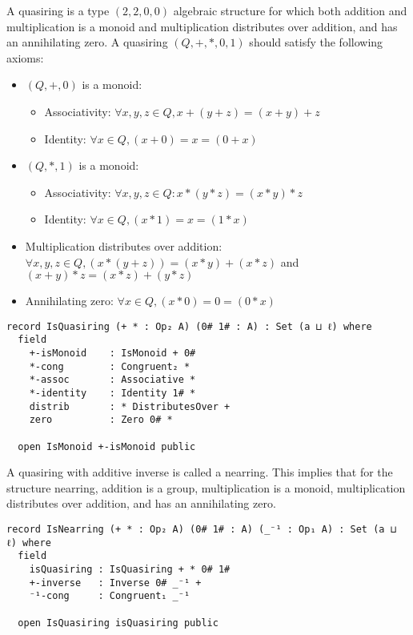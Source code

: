 A quasiring is a type $(2,2,0,0)$ algebraic structure for which both addition and
multiplication is a monoid and multiplication distributes over addition, and has
an annihilating zero. A quasiring $(Q,+,*,0,1)$ should satisfy the following axioms:
\begin{itemize}
  \item $(Q,+,0)$ is a monoid:
  \begin{itemize}
    \item Associativity: $\forall x,y,z \in Q, x + (y + z) = (x + y) + z$
    \item Identity: $\forall x \in Q, (x + 0) = x = (0 + x)$
  \end{itemize}
  \item $(Q,*,1)$ is a monoid:
  \begin{itemize}
    \item Associativity: $ \forall x,y,z \in Q: x * (y*z)  = (x*y)*z$
    \item Identity: $\forall x \in Q, (x * 1) = x = (1 * x)$
  \end{itemize}
  \item Multiplication distributes over addition: \(\forall x , y , z \in Q, (x * (y + z)) = (x * y) + (x
  * z)\) and \( (x + y) * z = (x * z) + (y * z) \)
  \item Annihilating zero: \(\forall x \in Q, (x * 0) = 0 = (0 * x)\)
\end{itemize}

\begin{verbatim}
record IsQuasiring (+ * : Op₂ A) (0# 1# : A) : Set (a ⊔ ℓ) where
  field
    +-isMonoid    : IsMonoid + 0#
    *-cong        : Congruent₂ *
    *-assoc       : Associative *
    *-identity    : Identity 1# *
    distrib       : * DistributesOver +
    zero          : Zero 0# *

  open IsMonoid +-isMonoid public
\end{verbatim}

A quasiring with additive inverse is called a nearring. This implies that for
the structure nearring, addition is a group, multiplication is a monoid,
multiplication distributes over addition, and has an annihilating zero.

\begin{verbatim}
record IsNearring (+ * : Op₂ A) (0# 1# : A) (_⁻¹ : Op₁ A) : Set (a ⊔ ℓ) where
  field
    isQuasiring : IsQuasiring + * 0# 1#
    +-inverse   : Inverse 0# _⁻¹ +
    ⁻¹-cong     : Congruent₁ _⁻¹

  open IsQuasiring isQuasiring public
\end{verbatim}

